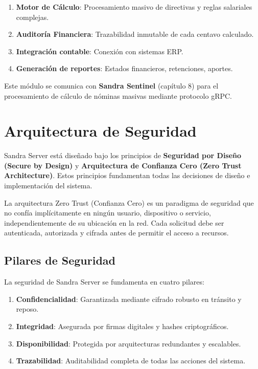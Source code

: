 \begin{enumerate}
\item \textbf{Motor de Cálculo}: Procesamiento masivo de directivas y reglas salariales complejas.
\item \textbf{Auditoría Financiera}: Trazabilidad inmutable de cada centavo calculado.
\item \textbf{Integración contable}: Conexión con sistemas ERP.
\item \textbf{Generación de reportes}: Estados financieros, retenciones, aportes.
\end{enumerate}

Este módulo se comunica con \textbf{Sandra Sentinel} (capítulo 8) para el procesamiento de cálculo de nóminas masivas mediante protocolo gRPC.

\newpage

\section{Arquitectura de Seguridad}

Sandra Server está diseñado bajo los principios de \textbf{Seguridad por Diseño (Secure by Design)} y \textbf{Arquitectura de Confianza Cero (Zero Trust Architecture)}. Estos principios fundamentan todas las decisiones de diseño e implementación del sistema.

\begin{definicion}
La arquitectura Zero Trust (Confianza Cero) es un paradigma de seguridad que no confía implícitamente en ningún usuario, dispositivo o servicio, independientemente de su ubicación en la red. Cada solicitud debe ser autenticada, autorizada y cifrada antes de permitir el acceso a recursos.
\end{definicion}

\subsection{Pilares de Seguridad}

La seguridad de Sandra Server se fundamenta en cuatro pilares:

\begin{enumerate}
\item \textbf{Confidencialidad}: Garantizada mediante cifrado robusto en tránsito y reposo.
\item \textbf{Integridad}: Asegurada por firmas digitales y hashes criptográficos.
\item \textbf{Disponibilidad}: Protegida por arquitecturas redundantes y escalables.
\item \textbf{Trazabilidad}: Auditabilidad completa de todas las acciones del sistema.
\end{enumerate}

